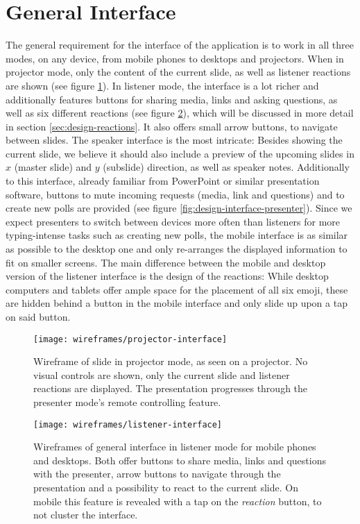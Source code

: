 \section{General Interface}
The general requirement for the interface of the application is to work in all three modes, on any device, from mobile phones to desktops and projectors. When in projector mode, only the content of the current slide, as well as listener reactions are shown (see figure \ref{fig:design-interface-projector}). In listener mode, the interface is a lot richer and additionally features buttons for sharing media, links and asking questions, as well as six different reactions (see figure \ref{fig:design-interface-listener}), which will be discussed in more detail in section \ref{sec:design-reactions}. It also offers small arrow buttons, to navigate between slides. The speaker interface is the most intricate: Besides showing the current slide, we believe it should also include a preview of the upcoming slides in $x$ (master slide) and $y$ (subslide) direction, as well as speaker notes. Additionally to this interface, already familiar from PowerPoint or similar presentation software, buttons to mute incoming requests (media, link and questions) and to create new polls are provided (see figure \ref{fig:design-interface-presenter}). Since we expect presenters to switch between devices more often than listeners for more typing-intense tasks such as creating new polls, the mobile interface is as similar as possible to the desktop one and only re-arranges the displayed information to fit on smaller screens. The main difference between the mobile and desktop version of the listener interface is the design of the reactions: While desktop computers and tablets offer ample space for the placement of all six emoji, these are hidden behind a button in the mobile interface and only slide up upon a tap on said button.

\begin{figure}
\centering
\texttt{[image: wireframes/projector-interface]}
\caption{Wireframe of slide in projector mode, as seen on a projector. No visual controls are shown, only the current slide and listener reactions are displayed. The presentation progresses through the presenter mode's remote controlling feature.}
\label{fig:design-interface-projector}
\end{figure}

\begin{figure}
\centering
\texttt{[image: wireframes/listener-interface]}
\caption{Wireframes of general interface in listener mode for mobile phones and desktops. Both offer buttons to share media, links and questions with the presenter, arrow buttons to navigate through the presentation and a possibility to react to the current slide. On mobile this feature is revealed with a tap on the \emph{reaction} button, to not cluster the interface.}
\label{fig:design-interface-listener}
\end{figure}


